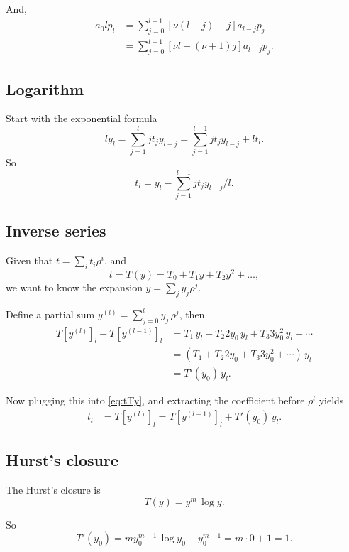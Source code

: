 \documentclass[preprint]{revtex4-1}
\numberwithin{equation}{subsection}
\numberwithin{table}{section}
\begin{document}
And,
\begin{align*}
  a_0 l p_l
&=
  \sum_{j = 0}^{l-1} [ \nu (l - j) - j] a_{l - j} p_j
\\
&=
  \sum_{j = 0}^{l-1} [ \nu l - (\nu + 1) j] a_{l - j} p_j.
\end{align*}


\subsection{Logarithm}

Start with the exponential formula
\[
  l y_l = \sum_{j = 1}^l j t_j y_{l - j}
  = \sum_{j = 1}^{l - 1} j t_j y_{l - j} + l t_l.
\]
So
\[
  t_l = y_l - \sum_{j = 1}^{l-1} j t_j y_{l - j}/l.
\]


\subsection{Inverse series}

Given that $t = \sum_i t_i \rho^i$, and
\begin{equation}
  t = T(y) = T_0 + T_1 y + T_2 y^2 + \dots,
  \label{eq:tTy}
\end{equation}
we want to know the expansion $y = \sum_j y_j \rho^j$.


Define a partial sum $y^{(l)} = \sum_{j=0}^l y_j \, \rho^j$,
then
\begin{align*}
  T\left[ y^{(l)} \right]_l
- T\left[ y^{(l-1)} \right]_l
&=
  T_1 \, y_l
+ T_2 2 y_0 \, y_l
+ T_3 3 y_0^2 \, y_l
+ \cdots
\\
&=
  (T_1
+ T_2 2 y_0
+ T_3 3 y_0^2
+ \cdots) \, y_l
\\
&= T'(y_0) \, y_l.
\end{align*}

Now plugging this into \eqref{eq:tTy},
and extracting the coefficient before $\rho^l$
yields
\begin{align*}
  t_l
&=
  T\left[ y^{(l)} \right]_l
=
  T\left[ y^{(l-1)} \right]_l + T'(y_0) \, y_l.
\end{align*}



\subsection{Hurst's closure}

The Hurst's closure is
\[
  T(y) = y^m \, \log y.
\]

So
\[
  T'(y_0)
  = m y_0^{m -1} \, \log y_0 + y_0^{m - 1}
  = m \cdot 0 + 1 = 1.
\]
\end{document}
